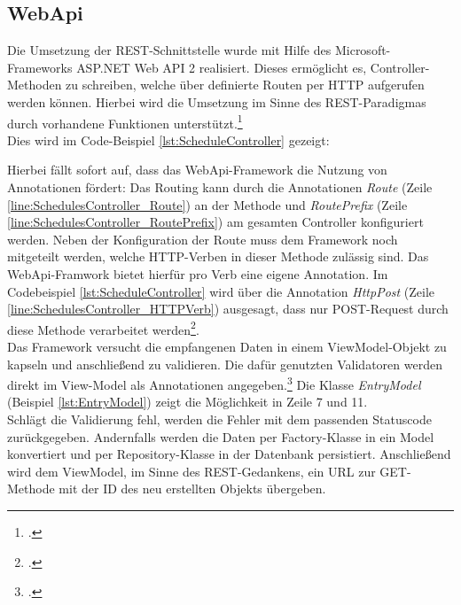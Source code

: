 \subsection{WebApi}
\label{ssec:aufbau-webapi}
Die Umsetzung der \ac{REST}-Schnittstelle wurde mit Hilfe des Microsoft-Frameworks \ac{ASP.NET Web API 2} realisiert. Dieses ermöglicht es, Controller-Methoden zu schreiben, welche über definierte Routen per HTTP aufgerufen werden können. Hierbei wird die Umsetzung im Sinne des \ac{REST}-Paradigmas durch vorhandene Funktionen unterstützt.\footcite[S. 2ff.]{Building-a-REST-Service}\\
Dies wird im Code-Beispiel \ref{lst:ScheduleController} gezeigt:

Hierbei fällt sofort auf, dass das WebApi-Framework die Nutzung von Annotationen fördert: Das Routing kann durch die Annotationen \textit{Route} (Zeile \ref{line:SchedulesController_Route}) an der Methode und \textit{RoutePrefix} (Zeile \ref{line:SchedulesController_RoutePrefix}) am gesamten Controller konfiguriert werden. Neben der Konfiguration der Route muss dem Framework noch mitgeteilt werden, welche HTTP-Verben in dieser Methode zulässig sind. Das WebApi-Framwork bietet hierfür pro Verb eine eigene Annotation. Im Codebeispiel \ref{lst:ScheduleController} wird über die Annotation \textit{HttpPost} (Zeile \ref{line:SchedulesController_HTTPVerb}) ausgesagt, dass nur POST-Request durch diese Methode verarbeitet werden\footcite{webApi-AttributeRouting}. \\
Das Framework versucht die empfangenen Daten in einem ViewModel-Objekt zu kapseln und anschließend zu validieren. Die dafür genutzten Validatoren werden direkt im View-Model als Annotationen angegeben.\footcite{webApi-Validation} Die Klasse \textit{EntryModel} (Beispiel \ref{lst:EntryModel}) zeigt die Möglichkeit in Zeile 7 und 11. \\ 
Schlägt die Validierung fehl, werden die Fehler mit dem passenden Statuscode zurückgegeben. Andernfalls werden die Daten per \ac{Factory}-Klasse in ein Model konvertiert und per \ac{Repository}-Klasse in der Datenbank persistiert. Anschließend wird dem ViewModel, im Sinne des \ac{REST}-Gedankens, ein URL zur GET-Methode mit der ID des neu erstellten Objekts übergeben. 

